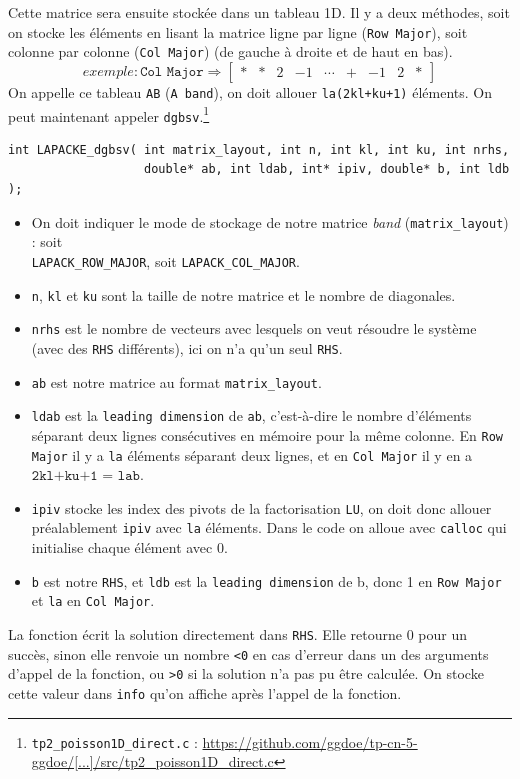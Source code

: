 \documentclass{article}
\begin{document}
Cette matrice sera ensuite stockée dans un tableau 1D. Il y a deux méthodes, soit on stocke les éléments en lisant la matrice ligne par ligne (\texttt{Row Major}), soit colonne par colonne (\texttt{Col Major}) (de gauche à droite et de haut en bas).
\[ 
	exemple : \texttt{Col Major} \Longrightarrow
	\begin{bmatrix}
	\ast & \ast	& 2 & -1 & \cdots & \texttt{+} & -1 & 2 & \ast
	\end{bmatrix}
\]
On appelle ce tableau \texttt{AB} (\texttt{A band}), on doit allouer \texttt{la(2kl+ku+1)} éléments.
On peut maintenant appeler \texttt{dgbsv}.\footnote{\texttt{tp2\_poisson1D\_direct.c} : \href{https://github.com/ggdoe/tp-cn-5-ggdoe/blob/master/TP_Poisson_C_for_students/src/tp2_poisson1D_direct.c}{https://github.com/ggdoe/tp-cn-5-ggdoe/[...]/src/tp2\_poisson1D\_direct.c}}
\begin{scriptsize}
\begin{verbatim}
int LAPACKE_dgbsv( int matrix_layout, int n, int kl, int ku, int nrhs, 
                   double* ab, int ldab, int* ipiv, double* b, int ldb );
\end{verbatim}
\end{scriptsize}
\begin{itemize}
\item On doit indiquer le mode de stockage de notre matrice \textit{band} (\texttt{matrix\_layout}) : soit \\ \texttt{LAPACK\_ROW\_MAJOR}, soit \texttt{LAPACK\_COL\_MAJOR}.
\item \texttt{n}, \texttt{kl} et \texttt{ku} sont la taille de notre matrice et le nombre de diagonales.
\item \texttt{nrhs} est le nombre de vecteurs avec lesquels on veut résoudre le système (avec des \texttt{RHS} différents), ici on n'a qu'un seul \texttt{RHS}.
\item \texttt{ab} est notre matrice au format \texttt{matrix\_layout}.
\item \texttt{ldab} est la \texttt{leading dimension} de \texttt{ab}, c'est-à-dire le nombre d'éléments  séparant deux lignes consécutives en mémoire pour la même colonne. En \texttt{Row Major} il y a \texttt{la} éléments séparant deux lignes, et en \texttt{Col Major} il y en a $\texttt{2kl+ku+1 = lab}$.
\item \texttt{ipiv} stocke les index des pivots de la factorisation \texttt{LU}, on doit donc allouer préalablement \texttt{ipiv} avec \texttt{la} éléments. Dans le code on alloue avec \texttt{calloc} qui initialise chaque élément avec 0.
\item \texttt{b} est notre \texttt{RHS}, et \texttt{ldb} est la \texttt{leading dimension} de b, donc 1 en \texttt{Row Major} et \texttt{la} en \texttt{Col Major}.
\end{itemize}
La fonction écrit la solution directement dans \texttt{RHS}.
Elle retourne 0 pour un succès, sinon elle renvoie un nombre \texttt{<0} en cas d'erreur dans un des arguments d'appel de la fonction, ou \texttt{>0} si la solution n'a pas pu être calculée. On stocke cette valeur dans \texttt{info} qu'on affiche après l'appel de la fonction.
\end{document}
